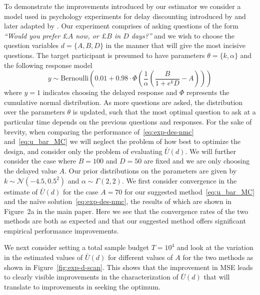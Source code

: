 To demonstrate the improvements introduced by our estimator
we consider a model used in psychology experiments for delay discounting introduced by 
\cite{vincent2016hierarchical} and later adapted by \cite{vincent2017darc}.  Our experiment 
comprises of asking questions of the form 
\emph{``Would you prefer $\pounds A$ now, or $\pounds B$ in $D$ days?''} and we wish 
to choose the question  variables $d = \{A,B,D\}$ in the manner that will give the most 
incisive questions.  The target participant is presumed to have parameters $\theta=\{k,\alpha\}$ 
and the following response model
\begin{equation}
y \sim \mathrm{Bernoulli} \left(0.01 + 0.98 \cdot \Phi\left(\frac{1}{\alpha} \left(\frac{B}{1+e^k D}-A\right)\right)\right)
\end{equation}
where $y=1$ indicates choosing the delayed response and $\Phi$ represents the 
cumulative normal distribution.  As more questions are asked, the distribution 
over the parameters $\theta$ is updated, such
that the most optimal question to ask at a particular time depends on the previous questions
and responses.  For the sake of brevity, when comparing the performance 
of~\eqref{eq:exp-des-nmc} and~\eqref{eq:u_bar_MC} we will neglect the problem 
of how best to optimize the design, and consider
only the problem of evaluating $\bar{U}(d)$.  We will further consider the case 
where $B=100$ and $D = 50$ are fixed and we are only choosing the delayed value $A$.
Our prior distributions on the parameters are given by $k \sim \mathcal{N}(-4.5,0.5^2)$
and $\alpha \sim \Gamma(2,2)$.
We first consider convergence in the estimate of $\bar{U}(d)$ for the case $A=70$ for our suggested method~\eqref{eq:u_bar_MC} and the na\"{i}ve solution~\eqref{eq:exp-des-nmc}, the results of which are shown in Figure~2a in the main paper. 
Here we see that the convergence rates of the two methods are both as expected and that our suggested method offers significant empirical performance improvements.  

We next consider setting a total sample budget $T=10^4$ and look at the variation in the estimated values of $\bar{U}(d)$ for different values of $A$ for the two methods as shown in Figure~\ref{fig:exp-d-scan}.
This shows that the improvement in MSE leads to clearly visible improvements in the characterization of $\bar{U}(d)$ that
will translate to improvements in seeking the optimum.